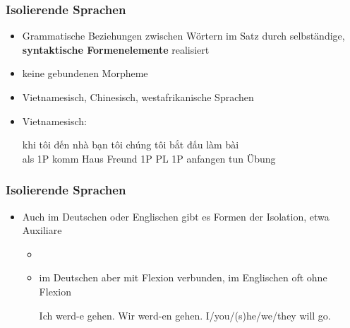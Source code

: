 \begin{frame}
\frametitle{Isolierende Sprachen}

\begin{itemize}
	\item Grammatische Beziehungen zwischen Wörtern im Satz durch selbständige, \textbf{syntaktische Formenelemente} realisiert
	\item[] \ras keine gebundenen Morpheme
	\item Vietnamesisch, Chinesisch, westafrikanische Sprachen
	
	\item[] Vietnamesisch:
	
\ea
\gll \foreignlanguage{vietnamese}{khi} \foreignlanguage{vietnamese}{tôi} \foreignlanguage{vietnamese}{đến} \foreignlanguage{vietnamese}{nhà} \foreignlanguage{vietnamese}{bạn} \foreignlanguage{vietnamese}{tôi} \foreignlanguage{vietnamese}{chúng} \foreignlanguage{vietnamese}{tôi} \foreignlanguage{vietnamese}{bắt đấu} \foreignlanguage{vietnamese}{làm} \foreignlanguage{vietnamese}{bài} \\
als 1P komm Haus Freund 1P PL 1P anfangen tun Übung \\
\z

\end{itemize}


\end{frame}

\begin{frame}
\frametitle{Isolierende Sprachen}

\begin{itemize}
	\item Auch im Deutschen oder Englischen gibt es Formen der Isolation, etwa Auxiliare
	
	\begin{itemize}
		\item[]
		\item im Deutschen aber mit Flexion verbunden, im Englischen oft ohne Flexion
		
		\eal 
			\ex Ich werd-e gehen.
			\ex Wir werd-en gehen.
			\ex I/you/(s)he/we/they will go.
		\zl
		
	\end{itemize}
\end{itemize}


\end{frame}


